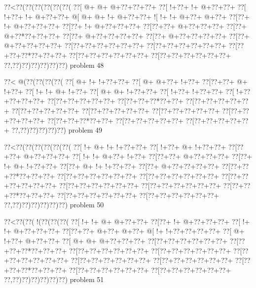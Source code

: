 \vbox{\vbox{\goo
\0??<\0??(\0??(\0??(\0??(\0??(\0??(
\0??[\- @+\- @+\- @+\0??+\0??+\0??+
\0??[\- !+\0??+\- !+\- @+\0??+\0??+
\0??[\- !+\0??+\- !+\- @+\0??+\0??+
\- @[\- @+\- @+\- !+\- @+\0??+\0??+
\- ![\- !+\- !+\- @+\0??+\- @+\0??+
\0??[\0??+\- !+\- @+\0??+\0??+\0??+
\0??[\0??+\- !+\- @+\0??+\0??+\0??+
\0??[\0??+\0??+\- @+\0??+\0??+\0??+
\0??[\0??+\- @+\0??*\0??+\0??+\0??+
\0??[\0??+\- @+\0??+\0??+\0??+\0??+
\0??[\0??+\- @+\0??+\0??+\0??+\0??+
\0??[\0??+\- @+\0??+\0??+\0??+\0??+
\0??[\0??+\0??+\0??+\0??+\0??+\0??+
\0??[\0??+\0??+\0??+\0??+\0??+\0??+
\0??[\0??+\0??+\0??*\0??+\0??+\0??+
\0??[\0??+\0??+\0??+\0??+\0??+\0??+
\0??[\0??+\0??+\0??+\0??+\0??+\0??+
\0??,\0??)\0??)\0??)\0??)\0??)\0??)
}
\hfil problem 48\hfil\break
}

\vbox{\vbox{\goo
\0??<\- @(\0??(\0??(\0??(\0??(
\0??[\- @+\- !+\- !+\0??+\0??+
\0??[\- @+\- @+\0??+\- !+\0??+
\0??[\0??+\0??+\- @+\- !+\0??+
\0??[\- !+\- !+\- @+\- !+\0??+
\0??[\- @+\- @+\- !+\0??+\0??+
\0??[\- !+\0??+\- !+\0??+\0??+
\0??[\- !+\0??+\0??+\0??+\0??+
\0??[\0??+\0??+\0??+\0??+\0??+
\0??[\0??+\0??+\0??*\0??+\0??+
\0??[\0??+\0??+\0??+\0??+\0??+
\0??[\0??+\0??+\0??+\0??+\0??+
\0??[\0??+\0??+\0??+\0??+\0??+
\0??[\0??+\0??+\0??+\0??+\0??+
\0??[\0??+\0??+\0??+\0??+\0??+
\0??[\0??+\0??+\0??*\0??+\0??+
\0??[\0??+\0??+\0??+\0??+\0??+
\0??[\0??+\0??+\0??+\0??+\0??+
\0??,\0??)\0??)\0??)\0??)\0??)
}
\hfil problem 49\hfil\break
}

\vbox{\vbox{\goo
\0??<\0??(\0??(\0??(\0??(\0??(\0??(
\0??[\- !+\- @+\- !+\- !+\0??+\0??+
\0??[\- !+\0??+\- @+\- !+\0??+\0??+
\0??[\0??+\0??+\- @+\0??+\0??+\0??+
\0??[\- !+\- !+\- @+\0??+\- !+\0??+
\0??[\0??+\0??+\- @+\0??+\0??+\0??+
\0??[\0??+\- !+\- @+\- !+\0??+\0??+
\0??[\0??+\- @+\- !+\- !+\0??+\0??+
\0??[\0??+\- @+\0??+\0??+\0??+\0??+
\0??[\0??+\0??+\0??*\0??+\0??+\0??+
\0??[\0??+\0??+\0??+\0??+\0??+\0??+
\0??[\0??+\0??+\0??+\0??+\0??+\0??+
\0??[\0??+\0??+\0??+\0??+\0??+\0??+
\0??[\0??+\0??+\0??+\0??+\0??+\0??+
\0??[\0??+\0??+\0??+\0??+\0??+\0??+
\0??[\0??+\0??+\0??*\0??+\0??+\0??+
\0??[\0??+\0??+\0??+\0??+\0??+\0??+
\0??[\0??+\0??+\0??+\0??+\0??+\0??+
\0??,\0??)\0??)\0??)\0??)\0??)\0??)
}
\hfil problem 50\hfil\break
}

\vbox{\vbox{\goo
\0??<\0??(\0??(\- !(\0??(\0??(\0??(
\0??[\- !+\- !+\- @+\- @+\0??+\0??+
\0??[\0??+\- !+\- @+\0??+\0??+\0??+
\0??[\- !+\- !+\- @+\0??+\0??+\0??+
\0??[\0??+\0??+\- @+\0??+\- @+\0??+
\- @[\- !+\- !+\0??+\0??+\0??+\0??+
\0??[\- @+\- !+\0??+\- @+\0??+\0??+
\0??[\- @+\- @+\- @+\0??+\0??+\0??+
\0??[\0??+\0??+\0??+\0??+\0??+\0??+
\0??[\0??+\0??+\0??*\0??+\0??+\0??+
\0??[\0??+\0??+\0??+\0??+\0??+\0??+
\0??[\0??+\0??+\0??+\0??+\0??+\0??+
\0??[\0??+\0??+\0??+\0??+\0??+\0??+
\0??[\0??+\0??+\0??+\0??+\0??+\0??+
\0??[\0??+\0??+\0??+\0??+\0??+\0??+
\0??[\0??+\0??+\0??*\0??+\0??+\0??+
\0??[\0??+\0??+\0??+\0??+\0??+\0??+
\0??[\0??+\0??+\0??+\0??+\0??+\0??+
\0??,\0??)\0??)\0??)\0??)\0??)\0??)
}
\hfil problem 51\hfil\break
}

